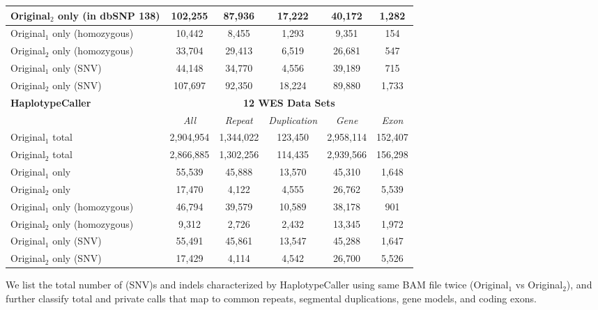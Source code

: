\begin{table}[htb]
\begin{center}
\begin{tabular}{|l|c||c|c|c|c|}
\hline
Original$_2$ only (in dbSNP 138) & 102,255   & 87,936    & 17,222  & 40,172    & 1,282   \\
\hline
Original$_1$ only (homozygous) & 10,442    & 8,455     & 1,293   & 9,351     & 154     \\
\hline
Original$_2$ only (homozygous) & 33,704    & 29,413    & 6,519   & 26,681    & 547     \\
\hline
Original$_1$ only (SNV) & 44,148    & 34,770    & 4,556   & 39,189    & 715     \\
\hline
Original$_2$ only (SNV) & 107,697   & 92,350    & 18,224  & 89,880    & 1,733   \\
\hline
\hline
{\bf HaplotypeCaller} & \multicolumn{5}{|c|}{\bf 12 WES Data Sets} \\
\hline
\cline{2-6}
{\bf} & {\it All} & {\it Repeat} & {\it Duplication} & {\it Gene} & {\it Exon} \\
\hline
Original$_1$ total & 2,904,954 & 1,344,022 & 123,450 & 2,958,114 & 152,407 \\
\hline
Original$_2$ total & 2,866,885 & 1,302,256 & 114,435 & 2,939,566 & 156,298 \\
\hline
Original$_1$ only & 55,539    & 45,888    & 13,570   & 45,310    & 1,648     \\
\hline
Original$_2$ only & 17,470   & 4,122    & 4,555  & 26,762    & 5,539   \\
\hline
Original$_1$ only (homozygous) & 46,794    & 39,579     & 10,589   & 38,178     & 901     \\
\hline
Original$_2$ only (homozygous) & 9,312    & 2,726    & 2,432   & 13,345    & 1,972     \\
\hline
Original$_1$ only (SNV) & 55,491    & 45,861    & 13,547   & 45,288    & 1,647     \\
\hline
Original$_2$ only (SNV) & 17,429   & 4,114    & 4,542  & 26,700    & 5,526   \\
\hline
\end{tabular}
\end{center}
{\footnotesize We list the total number of (SNV)s and indels characterized by HaplotypeCaller using same BAM file twice (Original$_1$ vs Original$_2$), 
and further classify total and private calls that map to common repeats, segmental duplications, gene models, and coding exons.}
\label{supptab:orig-vs-orig2-hc}
\end{table}

